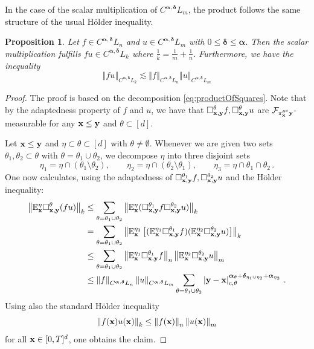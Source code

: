 \documentclass[12pt]{article}
\numberwithin{equation}{section}
\theoremstyle{plain}
\newtheorem{proposition}[theorem]{Proposition}
\theoremstyle{definition}
\newcommand{\abs}[1]{\left\vert #1 \right\vert}
\newcommand{\norm}[1]{\left\Vert #1\right\Vert}
\def\bE{\mathbb{E}}\def\bW{\mathbb{W}}
\def\fy{\mathbf y}\def\fz{\mathbf z}
\def\falpha{{\boldsymbol\alpha}}
\def\fdelta{{\boldsymbol\delta}}
\begin{document}
In the case of the scalar multiplication of $C^{\falpha,\fdelta}L_m$, the product follows the same structure of the usual H\"older inequality.
\begin{proposition}\label{prop:ProductCalphaSpace}
    Let $f\in C^{\falpha,\fdelta}L_n$ and $u\in C^{\falpha,\fdelta}L_m$ with $0\le\fdelta\le \falpha$. Then the scalar multiplication fulfills $fu\in C^{\falpha,\fdelta}L_k$ where $\frac 1k = \frac 1m+\frac 1n$. Furthermore, we have the inequality
    \begin{equation*}
        \norm{fu}_{C^{\falpha,\fdelta}L_k} \lesssim \norm{f}_{C^{\falpha,\fdelta}L_n}\norm{u}_{C^{\falpha,\fdelta}L_m}
    \end{equation*}
\end{proposition}
\begin{proof}
    The proof is based on the decomposition \eqref{eq:productOfSquares}. Note that by the adaptedness property of $f$ and $u$, we have that $\square_{\fx,\fy}^\theta f, \square_{\fx,\fy}^\theta u$ are $\cF_{\pi_\fx^{\theta^c} \fy}$-measurable for any $\fx\le\fy$ and $\theta\subset[d]$.

    Let $\fx\le\fy$ and $\eta\subset\theta\subset[d]$ with $\theta\neq\emptyset$. Whenever we are given two sets $\theta_1,\theta_2\subset\theta$ with $\theta=\theta_1\cup\theta_2$, we decompose $\eta$ into three disjoint sets
    \begin{equation*}
        \eta_1 = \eta\cap(\theta_1\setminus\theta_2), \qquad \eta_2 = \eta\cap(\theta_2\setminus\theta_1),\qquad \eta_3 = \eta\cap\theta_1\cap\theta_2\,.
    \end{equation*}
    One now calculates, using the adaptedness of $\square^{\theta_1}_{\fx,\fy} f, \square^{\theta_2}_{\fx,\fy} u$ and the Hölder inequality:
    \begin{align*}
        \norm{\bE^\eta_\fx \square^\theta_{\fx,\fy} (fu)}_k &\le \sum_{\theta = \theta_1\cup\theta_2} \norm{\bE^\eta_\fx(\square^{\theta_1}_{\fx,\fy} f\square^{\theta_2}_{\fx,\fy} u)}_k \\
        &= \sum_{\theta =\theta_1\cup\theta_2} \norm{\bE^{\eta_3}_\fx\left[ (\bE^{\eta_1}_\fx \square^{\theta_1}_{\fx,\fy} f)(\bE^{\eta_2}_\fx \square^{\theta_2}_{\fx,\fy} u)\right]}_k \\
        &\le \sum_{\theta =\theta_1\cup\theta_2} \norm{\bE^{\eta_1}_\fx\square^{\theta_1}_{\fx,\fy} f}_n \norm{\bE^{\eta_2}_\fx\square^{\theta_2}_{\fx,\fy} u}_m \\
        &\le \norm{f}_{C^{\falpha,\fdelta} L_n} \norm{u}_{C^{\falpha,\fdelta}L_m} \sum_{\theta=\theta_1\cup\theta_2}\abs{\fy-\fx}_{\text{c},\theta}^{\falpha_\theta + \fdelta_{\eta_1\cup\eta_2} + \falpha_{\eta_3}}\,.
    \end{align*}
    Using also the standard H\"older inequality 
    \[\norm{f(\fx)u(\fx)}_k \le \norm{f(\fx)}_n \norm{u(\fx)}_m  \]
    for all $\mathbf x\in[0,T]^d$, one obtains the claim.
\end{proof}
\end{document}
